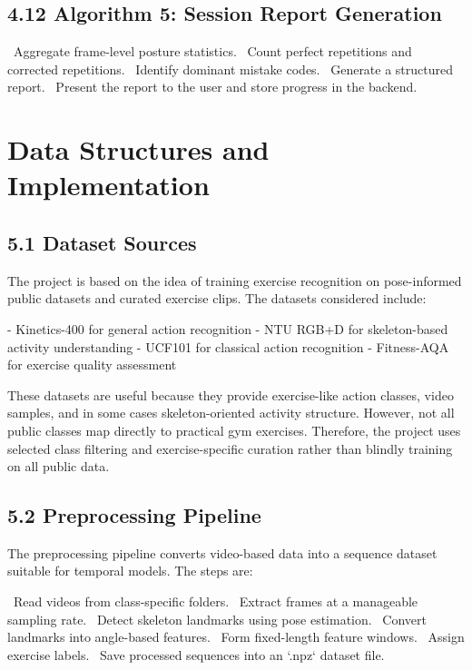 \documentclass[12pt,a4paper]{report}
\begin{document}
\section{4.12 Algorithm 5: Session Report Generation}
\noindent\textbullet\ Aggregate frame-level posture statistics.  
\noindent\textbullet\ Count perfect repetitions and corrected repetitions.  
\noindent\textbullet\ Identify dominant mistake codes.  
\noindent\textbullet\ Generate a structured report.  
\noindent\textbullet\ Present the report to the user and store progress in the backend.


\chapter{Data Structures and Implementation}

\section{5.1 Dataset Sources}
The project is based on the idea of training exercise recognition on pose-informed public datasets and curated exercise clips. The datasets considered include:

- Kinetics-400 for general action recognition
- NTU RGB+D for skeleton-based activity understanding
- UCF101 for classical action recognition
- Fitness-AQA for exercise quality assessment

These datasets are useful because they provide exercise-like action classes, video samples, and in some cases skeleton-oriented activity structure. However, not all public classes map directly to practical gym exercises. Therefore, the project uses selected class filtering and exercise-specific curation rather than blindly training on all public data.

\section{5.2 Preprocessing Pipeline}
The preprocessing pipeline converts video-based data into a sequence dataset suitable for temporal models. The steps are:

\noindent\textbullet\ Read videos from class-specific folders.  
\noindent\textbullet\ Extract frames at a manageable sampling rate.  
\noindent\textbullet\ Detect skeleton landmarks using pose estimation.  
\noindent\textbullet\ Convert landmarks into angle-based features.  
\noindent\textbullet\ Form fixed-length feature windows.  
\noindent\textbullet\ Assign exercise labels.  
\noindent\textbullet\ Save processed sequences into an `.npz` dataset file.
\end{document}
